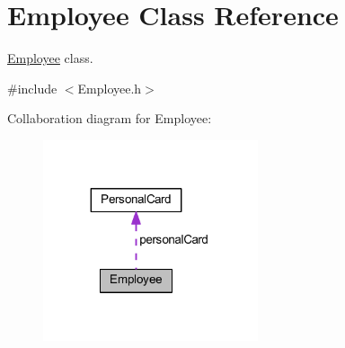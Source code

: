 \hypertarget{class_employee}{}\section{Employee Class Reference}
\label{class_employee}


\hyperlink{class_employee}{Employee} class.  




{\ttfamily \#include $<$Employee.\+h$>$}



Collaboration diagram for Employee\+:\nopagebreak
\begin{figure}[H]
\begin{center}
\leavevmode
\includegraphics[width=179pt]{class_employee__coll__graph}
\end{center}
\end{figure}

